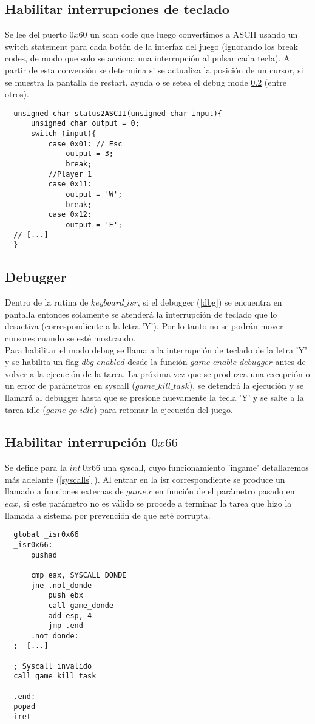 \subsection{Habilitar interrupciones de teclado}
Se lee del puerto $0x60$ un scan code que luego convertimos a ASCII usando un switch statement para cada botón de la interfaz del juego (ignorando los break codes, de modo que solo se acciona una interrupción al pulsar cada tecla).
A partir de esta conversión se determina si se actualiza la posición de un cursor, si se muestra la pantalla de restart, ayuda o se setea el debug mode \ref{isr_dbg} (entre otros).

\begin{lstlisting}
  unsigned char status2ASCII(unsigned char input){
      unsigned char output = 0;
      switch (input){
          case 0x01: // Esc
              output = 3;
              break;
          //Player 1
          case 0x11:
              output = 'W';
              break;
          case 0x12:
              output = 'E';
  // [...]
  }
\end{lstlisting}


\subsection{Debugger}
\label{isr_dbg}
Dentro de la rutina de $keyboard\_isr$, si el debugger (\ref{dbg}) se encuentra en pantalla entonces solamente se atenderá la interrupción de teclado que lo desactiva (correspondiente a la letra 'Y').
Por lo tanto no se podrán mover cursores cuando se esté mostrando.\\
Para habilitar el modo debug se llama a la interrupción de teclado de la letra 'Y' y se habilita un flag $dbg\_enabled$ desde la función $game\_enable\_debugger$ antes de volver a la ejecución de la tarea. La próxima vez que se produzca una excepción o un error de parámetros en syscall ($game\_kill\_task$), se detendrá la ejecución y se llamará al debugger hasta que se presione nuevamente la tecla 'Y' y se salte a la tarea idle ($game\_go\_idle$) para retomar la ejecución del juego.

\subsection{Habilitar interrupción $0x66$}
Se define para la $int\ 0x66$ una syscall, cuyo funcionamiento 'ingame' detallaremos más adelante (\ref{syscalls} ).
Al entrar en la isr correspondiente se produce un llamado a funciones externas de $game.c$ en función de el parámetro pasado en $eax$, si este parámetro no es válido se procede a terminar la tarea que hizo la llamada a sistema por prevención de que esté corrupta.
\begin{lstlisting}
  global _isr0x66
  _isr0x66:
      pushad

      cmp eax, SYSCALL_DONDE
      jne .not_donde
          push ebx
          call game_donde
          add esp, 4
          jmp .end
      .not_donde:
  ;  [...]

  ; Syscall invalido
  call game_kill_task

  .end:
  popad
  iret

\end{lstlisting}
